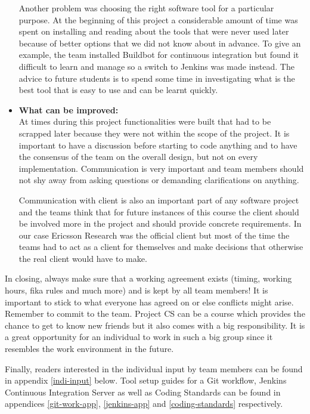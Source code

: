 \begin{itemize}
Another problem was choosing the right software tool for a particular purpose. At the 
beginning of this project a considerable amount of time was spent on installing and reading about the tools that were never 
used later because of better options that we did not know about in advance. To give an example, the team installed Buildbot for continuous integration but found 
it difficult to learn and manage so a switch to Jenkins was made instead. The advice to future students is to 
spend some time in investigating what is the best tool that is easy to use and can be learnt quickly.

\item{\textbf{What can be improved:}}\\
 At times during this project functionalities were built that had to be scrapped later because they were not 
 within the scope of the project. It is important to have a discussion before starting to code anything 
 and to have the consensus of the team on the overall design, but not on every implementation. Communication is very important and team members should not shy away from asking 
 questions or demanding clarifications on anything.  
 
Communication with client is also an important part of any software project and the teams think that 
for future instances of this course the client should be involved more in the project and should 
provide concrete requirements. In our case Ericsson Research was the official client 
but most of the time the teams had to act as a client for themselves and make decisions that otherwise the real 
client would have to make. 
\end{itemize}


In closing, always make sure that a working agreement exists (timing, working hours, fika rules and much more) and
is kept by all team members! It is important to stick to what everyone has agreed on or else
conflicts might arise. 
Remember to commit to the team. Project CS can be a course which provides the chance to get to know new friends but it also comes with a big responsibility.
It is a great opportunity for an individual to work in such a big group since
it resembles the work environment in the future.

Finally, readers interested in the individual input by team members can be found in appendix \ref{indi-input} below. Tool setup guides for a Git workflow, Jenkins Continuous Integration Server as well as Coding Standards can be found in appendices \ref{git-work-app}, \ref{jenkins-app} and \ref{coding-standards} respectively. 
